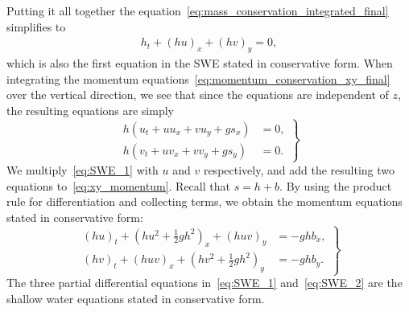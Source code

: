 Putting it all together the equation~\eqref{eq:mass_conservation_integrated_final} simplifies to
\begin{align}\label{eq:SWE_1}
    h_t + {(hu)}_x + {(hv)}_y = 0,
\end{align}
which is also the first equation in the SWE stated in conservative form.
When integrating the momentum equations~\eqref{eq:momentum_conservation_xy_final} over the vertical direction, we see that since the equations are independent of $z$, the resulting equations are simply
\begin{equation}\label{eq:xy_momentum}
    \left.
    \begin{aligned}
        h(u_t + uu_x + vu_y + g s_x) &= 0,\\
        h(v_t + uv_x + vv_y + g s_y) &= 0.
    \end{aligned}
    \right\}
\end{equation}
We multiply~\eqref{eq:SWE_1} with $u$ and $v$ respectively, and add the resulting two equations to~\eqref{eq:xy_momentum}.
Recall that $s = h + b$. 
By using the product rule for differentiation and collecting terms, we obtain the momentum equations stated in conservative form:
\begin{equation}\label{eq:SWE_2}
    \left.
    \begin{aligned}
        {(hu)}_t + {(hu^2 + \frac{1}{2}gh^2)}_x + {(huv)}_y &= -gh b_x,\\
        {(hv)}_t + {(huv)}_x + {(hv^2 + \frac{1}{2}gh^2)}_y &= -gh b_y.
    \end{aligned}
    \right\}
\end{equation}
The three partial differential equations in~\eqref{eq:SWE_1} and~\eqref{eq:SWE_2} are the shallow water equations stated in conservative form.

